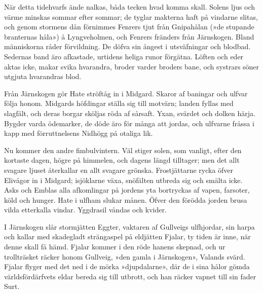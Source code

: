 När detta tidehvarfs ände nalkas, båda tecken hvad komma skall. Solens
ljus och värme minskas sommar efter sommar; de tyglar makterna haft på
vindarne slitas, och genom stormens dån förnimmes Fenrers tjut från
Gnipahålan (»de stupande branternas håla») å Lyngveholmen, och Fenrers
fränders från Järnskogen. Bland människorna råder förvildning. De döfva
sin ångest i utsväfningar och blodbad. Sedernas band äro afkastade,
urtidens heliga runor förgätna. Löften
och eder aktas icke, makar svika hvarandra, broder varder broders bane,
och systrars söner utgjuta hvarandras blod.

Från Järnskogen gör Hate ströftåg in i Midgard. Skaror af baningar och
ulfvar följa honom. Midgards höfdingar ställa sig till motvärn; landen
fyllas med slagfält, och deras borgar sköljas röda af sårsaft. Yxan,
svärdet och dolken härja. Bygder varda ödemarker, de döde äro för många
att jordas, och ulfvarne fråssa i kapp med förruttnelsens Nidhögg på
otaliga lik.

Nu kommer den andre fimbulvintern. Väl stiger solen, som vanligt, efter
den kortaste dagen, högre på himmelen, och dagens längd tilltager; men
det allt svagare ljuset återkallar en allt svagare grönska.
Frostjättarne rycka öfver Elivågor in i Midgard; isjöklarne växa,
snöfälten utbreda sig och smälta icke. Asks och Emblas alla afkomlingar
på jordens yta bortryckas af vapen, farsoter, köld och hunger. Hate i
ulfham slukar månen. Öfver den förödda jorden brusa vilda etterkalla
vindar. Yggdrasil våndas och kvider.

I Järnskogen slår stormjätten Eggter, vaktaren af Gullveigs ulfhjordar,
sin harpa och kallar med skadegladt strängaspel på eldjätten Fjalar, ty
tiden är inne, när denne skall få hämd. Fjalar kommer i den röde hanens
skepnad, och ur trollträsket räcker honom Gullveig, »den gamla i
Järnskogen», Valands svärd. Fjalar flyger med det ned i de mörka
»djupdalarne», där de i sina hålor gömda världsfördärfvets eldar bereda
sig till utbrott, och han räcker vapnet till sin fader Surt.

